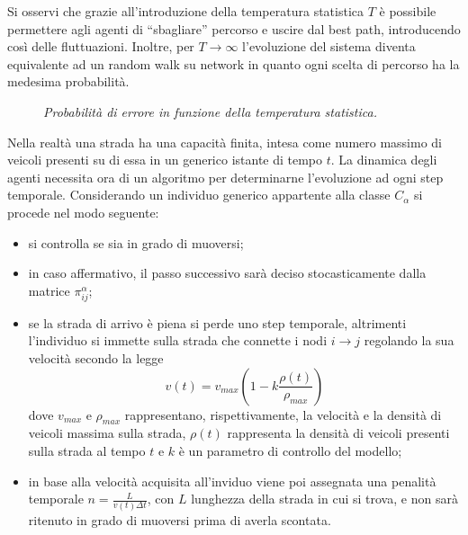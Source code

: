 \documentclass[../main.tex]{subfiles}
\begin{document}
Si osservi che grazie all'introduzione della temperatura statistica $T$ \`e possibile permettere agli agenti di ``sbagliare'' percorso e uscire dal best path, introducendo cos\`i delle fluttuazioni.
Inoltre, per $T \to \infty$ l'evoluzione del sistema diventa equivalente ad un random walk su network in quanto ogni scelta di percorso ha la medesima probabilit\`a.
\begin{figure}[H]
    \centering
    \caption[Temperatura statistica]{\emph{Probabilit\`a di errore in funzione della temperatura statistica.}}
    \label{fig:temperature}
\end{figure}
Nella realt\`a una strada ha una capacit\`a finita, intesa come numero massimo di veicoli presenti su di essa in un generico istante di tempo $t$.
La dinamica degli agenti necessita ora di un algoritmo per determinarne l'evoluzione ad ogni step temporale.
Considerando un individuo generico appartente alla classe $C_{\alpha}$ si procede nel modo seguente:
\begin{itemize}
    \item si controlla se sia in grado di muoversi;
    \item in caso affermativo, il passo successivo sarà deciso stocasticamente dalla matrice $\pi_{ij}^{\alpha}$;
    \item se la strada di arrivo \`e piena si perde uno step temporale, altrimenti l'individuo si immette sulla strada che connette i nodi $i \to j$ regolando la sua velocit\`a secondo la legge 
    \begin{equation}
        v(t) = v_{max}\left(1-k\frac{\rho(t)}{\rho_{max}}\right)
    \end{equation}
    dove $v_{max}$ e $\rho_{max}$ rappresentano, rispettivamente, la velocit\`a e la densit\`a di veicoli massima sulla strada, $\rho(t)$ rappresenta la densit\`a di veicoli presenti sulla strada al tempo $t$ e $k$ \`e un parametro di controllo del modello;
    \item in base alla velocit\`a acquisita all'inviduo viene poi assegnata una penalit\`a temporale $n = \frac{L}{v(t)\Delta t}$, con $L$ lunghezza della strada in cui si trova, e non sar\`a ritenuto in grado di muoversi prima di averla scontata.
\end{itemize}
\end{document}
